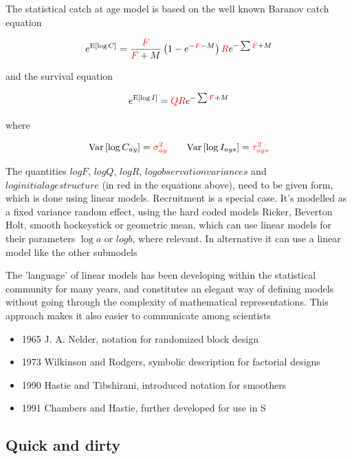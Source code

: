 \documentclass[a4paper,english,10pt]{article}\usepackage[]{graphicx}\usepackage[]{color}
\newcommand{\E}[1]{\text{E}\left[#1\right]}
\newcommand{\Var}[1]{\text{Var}\left[#1\right]}
\begin{document}
The statistical catch at age model is based on the well known Baranov catch equation 

\begin{equation*}
e^{\E{\log C}} = \frac{\color{red}F}{{\color{red}F}+M}\left(1 - e^{-{\color{red}F}-M}\right) {\color{red}R}e^{-\sum {\color{red}F} + M}
\end{equation*}

and the survival equation

\begin{equation*}
e^{\E{\log I}} = {\color{red}Q} {\color{red}R}e^{-\sum {\color{red}F} + M}
\end{equation*}

where 

\begin{equation*}
\Var{\log C_{ay}} = {\color{red}\sigma^2_{ay}} \qquad \Var{\log I_{ays}} = {\color{red}\tau^2_{ays}}
\end{equation*}

The quantities $log F$, $log Q$, $log R$, $log observation variances$ and $log initial age structure$ (in red in the equations above), need to be given form, which is done using linear models. Recruitment is a special case. It's modelled as a fixed variance random effect, using the hard coded models Ricker, Beverton Holt, smooth hockeystick or geometric mean, which can use linear models for their parameters $\log{a}$ or $log b$, where relevant. In alternative it can use a linear model like the other submodels 

The 'language' of linear models has been developing within the statistical community for many years, and constitutes an elegant way of defining models without going through the complexity of mathematical representations. This approach makes it also easier to communicate among scientists 
  \begin{itemize}
  \item 1965 J. A. Nelder, notation for randomized block design
  \item 1973 Wilkinson and Rodgers, symbolic description for factorial designs
  \item 1990 Hastie and Tibshirani, introduced notation for smoothers
  \item 1991 Chambers and Hastie, further developed for use in S
  \end{itemize}

\subsection{Quick and dirty}
\end{document}
